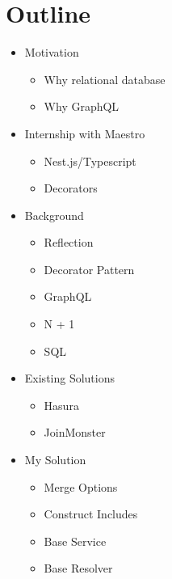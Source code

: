 \section{Outline}
\begin{itemize}
    \item Motivation
    \begin{itemize}
        \item Why relational database
        \item Why GraphQL
    \end{itemize}
    \item{Internship with Maestro}
    \begin{itemize}
        \item Nest.js/Typescript
        \item Decorators
    \end{itemize}
    \item Background
    \begin{itemize}
        \item Reflection
        \item Decorator Pattern
        \item GraphQL
        \item N + 1
        \item SQL
    \end{itemize}
    \item Existing Solutions
    \begin{itemize}
        \item Hasura
        \item JoinMonster
    \end{itemize}
    \item My Solution
    \begin{itemize}
        \item Merge Options
        \item Construct Includes
        \item Base Service
        \item Base Resolver
    \end{itemize}
\end{itemize}